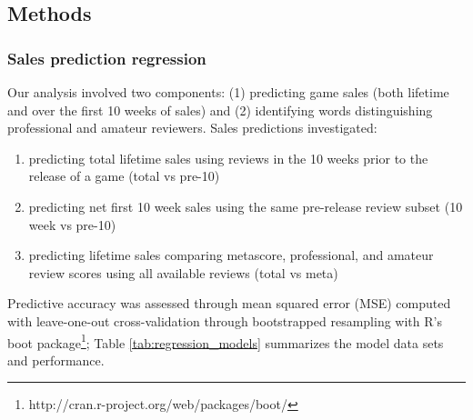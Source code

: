 \documentclass[letterpaper]{article}
\begin{document}
\subsection{Methods}
\subsubsection{Sales prediction regression}
Our analysis involved two components: (1) predicting game sales (both lifetime and over the first 10 weeks of sales) and (2) identifying words distinguishing professional and amateur reviewers. Sales predictions investigated: 
\begin{enumerate}
\item predicting total lifetime sales using reviews in the 10 weeks prior to the release of a game (total vs pre-10)
\item predicting net first 10 week sales using the same pre-release review subset (10 week vs pre-10)
\item predicting lifetime sales comparing metascore, professional, and amateur review scores using all available reviews (total vs meta)
\end{enumerate}
Predictive accuracy was assessed through mean squared error (MSE) computed with leave-one-out cross-validation through bootstrapped resampling with R's boot package\footnote{http://cran.r-project.org/web/packages/boot/}; Table \ref{tab:regression_models} summarizes the model data sets and performance.
\end{document}
